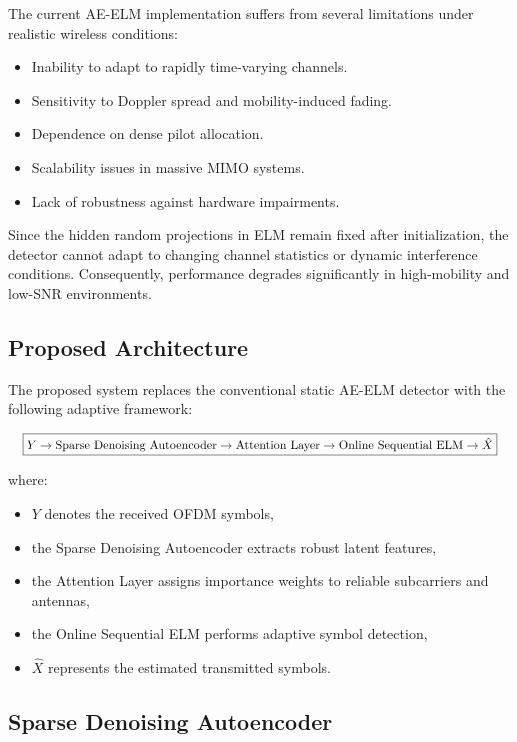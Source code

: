 \documentclass[10pt, conference]{IEEEtran}
\begin{document}
The current AE-ELM implementation suffers from several limitations under realistic wireless conditions:

\begin{itemize}
    \item Inability to adapt to rapidly time-varying channels.
    \item Sensitivity to Doppler spread and mobility-induced fading.
    \item Dependence on dense pilot allocation.
    \item Scalability issues in massive MIMO systems.
    \item Lack of robustness against hardware impairments.
\end{itemize}

Since the hidden random projections in ELM remain fixed after initialization, the detector cannot adapt to changing channel statistics or dynamic interference conditions. Consequently, performance degrades significantly in high-mobility and low-SNR environments.

\subsection{Proposed Architecture}

The proposed system replaces the conventional static AE-ELM detector with the following adaptive framework:

\[
\resizebox{\columnwidth}{!}{
\boxed{
Y
\rightarrow
\text{Sparse Denoising Autoencoder}
\rightarrow
\text{Attention Layer}
\rightarrow
\text{Online Sequential ELM}
\rightarrow
\hat{X}
}
}
\]

where:
\begin{itemize}
    \item $Y$ denotes the received OFDM symbols,
    \item the Sparse Denoising Autoencoder extracts robust latent features,
    \item the Attention Layer assigns importance weights to reliable subcarriers and antennas,
    \item the Online Sequential ELM performs adaptive symbol detection,
    \item $\hat{X}$ represents the estimated transmitted symbols.
\end{itemize}

\subsection{Sparse Denoising Autoencoder}
\end{document}
